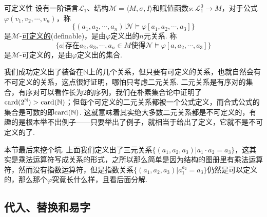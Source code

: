 \begin{definition}{可定义性}
    设有一阶语言\(\mathcal{L}_1\)、结构\(\mathcal{M}=\langle M,\sigma,I \rangle\)和赋值函数\(s:\mathcal{L}_1^0 \to M\)，对于公式\(\varphi(v_1,v_2, \cdots,v_n)\)，称
    \[\{(a_1,a_2,\cdots,a_n)|\mathcal{N} \vDash \varphi[a_1,a_2,\cdots,a_3]\}\]
    是\(\mathcal{M}\)-\underline{可定义的}(definable)，是由\(\varphi\)定义出的\(n\)元关系. 称
    \[\{a|\mbox{存在}a_2,a_3,\cdots,a_n \in M\mbox{使得}\mathcal{N} \vDash \varphi[a,a_2,\cdots,a_3]\}\]
    是\(\mathcal{M}\)-可定义的，是由\(\varphi\)定义出的集合. 
\end{definition}

我们成功定义出了装备在\(\mathbb{N}\)上的几个关系，但只要有可定义的关系，也就自然会有不可定义的关系，这点很好证明，哪怕只考虑二元关系. 二元关系是有序对的集合，有序对可以看作长为\(2\)的序列，我们在朴素集合论中证明了\({\rm card}(2^\mathbb{N})>{\rm card}(\mathbb{N})\)；但每个可定义的二元关系都被一个公式定义，而合式公式的集合是可数的即\({\rm card}(\mathbb{N})\). 这就意味着其实绝大多数二元关系都是不可定义的，有趣的是根本举不出例子——只要举出了例子，就相当于给出了定义，它就不是不可定义的了.

本节最后来挖个坑. 上面我们定义出了三元关系\(\{(a_1,a_2,a_3)|a_1 \cdot a_2 = a_3\}\)，这其实是乘法运算符写成关系的形式，之所以那么简单是因为结构的图册里有乘法运算符，然而没有指数运算符，但是指数关系\(\{(a_1,a_2,a_3)|a_1^{a_2} = a_3\}\)仍然是可以定义的，那么那个\(\varphi\)究竟长什么样，且看后面分解.

\subsection{代入、替换和易字}

